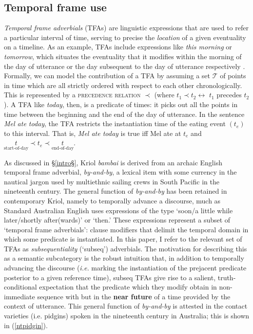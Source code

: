 \documentclass[11pt]{article}
\begin{document}
	\subsection{Temporal frame use}\label{dataStfa}
\textit{Temporal frame adverbials} (TFAs) are linguistic expressions that are used to refer a particular interval of time, serving to precise the \textit{location} of a given eventuality on a timeline. As an example, TFAs include expressions like \textit{this morning} or \textit{tomorrow}, which situates the eventuality that it modifies within the morning of the day of utterance or the day subsequent to the day of utterance respectively \citep[see][307]{Binnick1991}. Formally, we can model the contribution of a TFA by assuming a set  $\mathcal T$  of points in time which are all strictly ordered with respect to each other chronologically. This is represented by a \textsc{precedence relation} $ \prec $ (where $t_1\prec t_2\leftrightarrow$ $t_1$ precedes $t_2$). A TFA like \textit{today}, then, is a predicate of times: it picks out all the points in time between the beginning and the end of the day of utterance. In the sentence \textit{Mel ate today}, the TFA restricts the instantiation time of the eating event $(t_e)$ to this interval. That is, \textit{Mel ate today} is true iff Mel ate at $t_e$ and $\underset{\text{start-of-day}}{t}\prec t_e\prec\underset{\text{end-of-day}}{t}$.
	
	
As discussed in §\ref{intro§}, Kriol \textit{bambai} is derived from an archaic English temporal frame adverbial, \textit{by-and-by}, a lexical item with some currency in the nautical jargon used by multiethnic sailing crews in South Pacific in the nineteenth century. The general function of \textit{by-and-by} has been retained in contemporary Kriol, namely to temporally advance a discourse, much as Standard Australian English uses expressions of the type `soon/a little while later/shortly after(wards)' or `then.' These expressions represent a subset of `temporal frame adverbials': clause modifiers that delimit the temporal domain in which some predicate is instantiated. In this paper, I refer to the relevant set of TFAs as \textit{subsequentiality} ({\sc`subseq'}) adverbials. The motivation for describing this as a semantic subcategory is the robust intuition that, in addition to temporally advancing the discourse (\textit{i.e.} marking the instantiation of the prejacent predicate posterior to a given reference time), {\sc subseq} TFAs give rise to a salient, truth-conditional expectation that the predicate which they modify obtain in non-immediate sequence with but in the \textbf{near future} of a time provided by the context of utterance. This general function of \textit{by-and-by} is attested in the contact varieties (i.e. pidgins) spoken in the nineteenth century in Australia; this is shown in (\ref{ntpidgin}).
\end{document}
